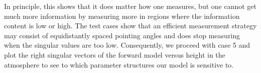 
In principle, this shows that it does matter how one measures, but one cannot get much more information by measuring more in regions where the information content is low or high.
The test cases show that an efficient measurement strategy may consist of equidistantly spaced pointing angles and does stop measuring when the singular values are too low. 
Consequently, we proceed with case 5 and plot the right singular vectors of the forward model versus height in the atmosphere to see to which parameter structures our model is sensitive to.

